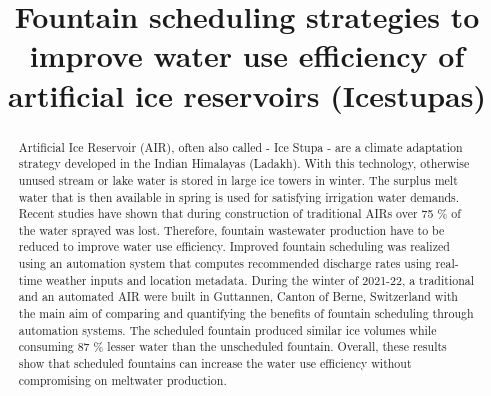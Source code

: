 \documentclass[tc, manuscript]{copernicus}
\begin{document}
\title{Fountain scheduling strategies to improve water use efficiency of artificial
ice reservoirs (Icestupas)}

\def\Authors{Suryanarayanan Balasubramanian\,$^{1,2}$, Martin Hoelzle\,$^{1}$Roger Waser\,$^{3}$,}

\def\Address{$^{1}$University of Fribourg, Department of Geosciences, Fribourg, Switzerland $^{2}$University of
Applied Sciences and Arts, Luzern, Switzerland} \def\corrAuthor{Suryanarayanan Balasubramanian}





\maketitle

\begin{abstract}

  Artificial Ice Reservoir (AIR), often also called - Ice Stupa - are a climate adaptation strategy developed in
  the Indian Himalayas (Ladakh). With this technology, otherwise unused stream or lake water is stored in large
  ice towers in winter. The surplus melt water that is then available in spring is used for satisfying
  irrigation water demands. Recent studies have shown that during construction of traditional AIRs over 75 \% of
  the water sprayed was lost. Therefore, fountain wastewater production have to be reduced to improve water use
  efficiency. Improved fountain scheduling was realized using an automation system that computes recommended
  discharge rates using real-time weather inputs and location metadata. During the winter of 2021-22, a
  traditional and an automated AIR were built in Guttannen, Canton of Berne, Switzerland with the main aim of
  comparing and quantifying the benefits of fountain scheduling through automation systems. The scheduled
  fountain produced similar ice volumes while consuming 87 \% lesser water than the unscheduled fountain.
  Overall, these results show that scheduled fountains can increase the water use efficiency without
  compromising on meltwater production.

\end{abstract}
\end{document}
